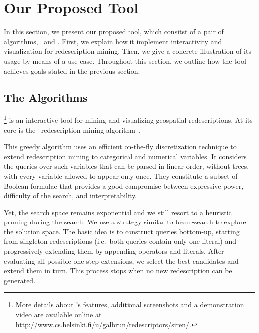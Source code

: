 \section{Our Proposed Tool}

In this section, we present our proposed tool, which consitst of a pair of
algorithms, \ReReMi\ and \Siren. First, we explain how it implement
interactivity and visualization for redescription mining.  Then, we
give a concrete illustration of its usage by means of a
use case. Throughout this section, we outline how the tool achieves
goals stated in the previous section.

\subsection{The Algorithms}
\label{sec:algorithms}

\Siren\footnote{More details about \Siren's features, additional
  screenshots and a demonstration video are available online at
  \url{http://www.cs.helsinki.fi/u/galbrun/redescriptors/siren/}.}  is
an interactive tool for mining and visualizing geospatial
redescriptions. At its core is the \ReReMi\ redescription mining
algorithm~\cite{galbrun11black,galbrun12black}.

This greedy algorithm
uses an efficient on-the-fly discretization technique to extend
redescription mining to categorical and numerical variables.
It considers the queries over such variables that can be parsed in linear
order, without trees, with every variable allowed to appear only once.
They constitute a subset of Boolean formulae that
provides a good compromise between expressive power, difficulty of the
search, and interpretability.

Yet, the search space remains exponential and we still resort to a
heuristic pruning during the search.  We use a strategy similar to
beam-search to explore the solution space.  The basic idea is to
construct queries bottom-up, starting from singleton redescriptions
(i.e.\ both queries contain only one literal) and progressively
extending them by appending operators and
literals. %
After evaluating all possible one-step extensions, we select the best
candidates and extend them in turn. This process stops when no new
redescription can be generated.

